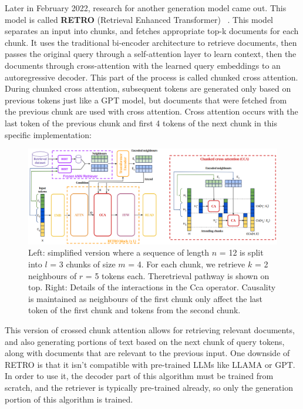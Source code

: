 \documentclass[twocolumn, 10pt]{article}
\begin{document}
Later in February 2022, research for another generation model came out. This model is called \textbf{RETRO} (Retrieval Enhanced Transformer) ~\cite{borgeaud2022improving}. This model separates an input into chunks, and fetches appropriate top-k documents for each chunk. It uses the traditional bi-encoder architecture to retrieve documents, then passes the original query through a self-attention layer to learn context, then the documents through cross-attention with the learned query embeddings to
an autoregressive decoder. This part of the process is called chunked cross attention. During chunked cross attention, subsequent tokens are generated only based on previous tokens just like a GPT model, but documents that were fetched from the previous chunk are used with cross attention. Cross attention occurs with the last token of the previous chunk and first 4 tokens of the next chunk in this specific implementation:

\begin{figure}[H]
    \centering
     \includegraphics[width=\linewidth]{RETRO_CCA.png}
    \caption{Left: simplified version where a sequence of length \(n\) = 12 is split into \(l\) = 3 chunks of size \(m\) = 4. For each chunk, we retrieve \(k\) = 2 neighbours of \(r\) = 5 tokens each. Theretrieval pathway is shown on top. Right: Details of the interactions in the Cca operator. Causality is maintained as neighbours of the first chunk only affect the last token of the first chunk and tokens from the second chunk.}
    \label{fig:indexing-process}
\end{figure}

This version of crossed chunk attention allows for retrieving relevant documents, and also generating portions of text based on the next chunk of query tokens, along with documents that are relevant to the previous input.
One downside of RETRO is that it isn't compatible with pre-trained LLMs like LLAMA or GPT. In order to use it, the decoder part of this algorithm must be trained from scratch, and the retriever is typically pre-trained already, so only the generation portion of this algorithm is trained.
\end{document}
